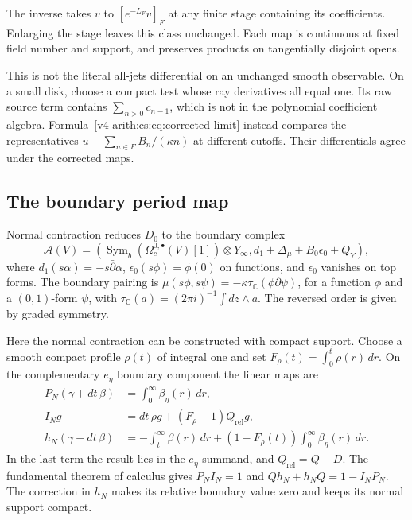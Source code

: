 The inverse takes \(v\) to \([e^{-L_F}v]_F\) at any finite stage containing
its coefficients. Enlarging the stage leaves this class unchanged. Each map
is continuous at fixed field number and support, and preserves products on
tangentially disjoint opens.

This is not the literal all-jets differential on an unchanged smooth
observable. On a small disk, choose a compact test whose ray derivatives all
equal one. Its raw source term contains \(\sum_{n>0}c_{n-1}\), which is not
in the polynomial coefficient algebra.
Formula~\eqref{v4-arith:cs:eq:corrected-limit} instead compares the
representatives \(u-\sum_{n\in F}B_n/(\kappa n)\) at different cutoffs.
Their differentials agree under the corrected maps.

\subsection{The boundary period map}

Normal contraction reduces \(D_0\) to the boundary complex
\begin{equation}
 \mathcal A(V)=
 \left(\operatorname{Sym}_b(\Omega_c^{0,\bullet}(V)[1])
              \otimes Y_\infty,
     d_1+\Delta_\mu+B_0\epsilon_0+Q_Y\right),
 \label{v4-arith:cs:eq:boundary-complex}
\end{equation}
where \(d_1(s\alpha)=-s\bar\partial\alpha\), \(\epsilon_0(s\phi)=\phi(0)\)
on functions, and \(\epsilon_0\) vanishes on top forms. The boundary pairing
is \(\mu(s\phi,s\psi)=-\kappa\tau_{\mathbb C} (\phi\partial\psi)\), for a
function \(\phi\) and a \((0,1)\)-form \(\psi\), with \(\tau_{\mathbb
C}(a)=(2\pi i)^{-1}\int dz\wedge a\). The reversed order is given by graded
symmetry.

Here the normal contraction can be constructed with compact support. Choose
a smooth compact profile \(\rho(t)\) of integral one and set
\(F_\rho(t)=\int_0^t\rho(r)\,dr\). On the complementary \(e_\eta\) boundary
component the linear maps are
\begin{align*}
 P_N(\gamma+dt\,\beta)&=\int_0^\infty\beta_\eta(r)\,dr,\\
 I_Ng&=dt\,\rho g+(F_\rho-1)Q_{\mathrm{rel}}g,\\
 h_N(\gamma+dt\,\beta)&=-\int_t^\infty\beta(r)\,dr
          +(1-F_\rho(t))\int_0^\infty\beta_\eta(r)\,dr.
\end{align*}
In the last term the result lies in the \(e_\eta\) summand, and
\(Q_{\mathrm{rel}}=Q-D\). The fundamental theorem of calculus gives
\(P_NI_N=1\) and \(Qh_N+h_NQ=1-I_NP_N\). The correction in \(h_N\) makes its
relative boundary value zero and keeps its normal support compact.

